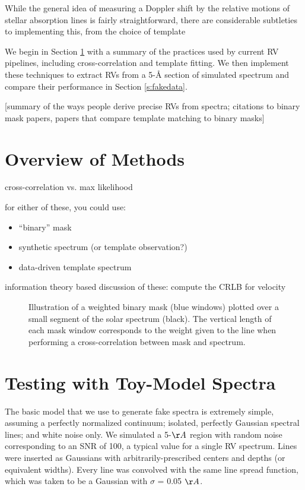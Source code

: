 \documentclass[modern]{aastex61}
\begin{document}
While the general idea of measuring a Doppler shift by the relative motions of stellar absorption lines is fairly straightforward, there are considerable subtleties to implementing this, from the choice of template 

We begin in Section \ref{s:methods} with a summary of the practices used by current RV pipelines, including cross-correlation and template fitting. We then implement these techniques to extract RVs from a 5-\r{A} section of simulated spectrum and compare their performance in Section \ref{s:fakedata}. 

[summary of the ways people derive precise RVs from spectra; citations to binary mask papers, papers that compare template matching to binary masks]

\section{Overview of Methods}
\label{s:methods}

cross-correlation vs. max likelihood

for either of these, you could use:
\begin{itemize}
\item ``binary'' mask
\item synthetic spectrum (or template observation?)
\item data-driven template spectrum
\end{itemize}

information theory based discussion of these: compute the CRLB for velocity

\begin{figure}
\centering
\caption{Illustration of a weighted binary mask (blue windows) plotted over a small segment of the solar spectrum (black). The vertical length of each mask window corresponds to the weight given to the line when performing a cross-correlation between mask and spectrum.}
\label{fig:binarymask}
\end{figure}


\section{Testing with Toy-Model Spectra}

The basic model that we use to generate fake spectra is extremely simple, assuming a perfectly normalized continuum; isolated, perfectly Gaussian spectral lines; and white noise only. We simulated a 5-$\AA$ region with random noise corresponding to an SNR of 100, a typical value for a single RV spectrum. Lines were inserted as Gaussians with arbitrarily-prescribed centers and depths (or equivalent widths). Every line was convolved with the same line spread function, which was taken to be a Gaussian with $\sigma$ = 0.05 $\AA$. %
\end{document}
